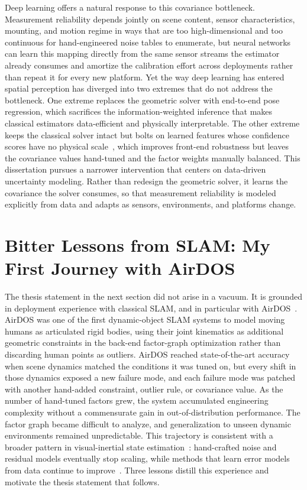Deep learning offers a natural response to this covariance bottleneck.
Measurement reliability depends jointly on scene content, sensor characteristics, mounting, and motion regime in ways that are too high-dimensional and too continuous for hand-engineered noise tables to enumerate, but neural networks can learn this mapping directly from the same sensor streams the estimator already consumes and amortize the calibration effort across deployments rather than repeat it for every new platform.
Yet the way deep learning has entered spatial perception has diverged into two extremes that do not address the bottleneck.
One extreme replaces the geometric solver with end-to-end pose regression, which sacrifices the information-weighted inference that makes classical estimators data-efficient and physically interpretable.
The other extreme keeps the classical solver intact but bolts on learned features whose confidence scores have no physical scale~\cite{teed2021droid, teed2024deep}, which improves front-end robustness but leaves the covariance values hand-tuned and the factor weights manually balanced.
This dissertation pursues a narrower intervention that centers on data-driven uncertainty modeling.
Rather than redesign the geometric solver, it learns the covariance the solver consumes, so that measurement reliability is modeled explicitly from data and adapts as sensors, environments, and platforms change.

\section{Bitter Lessons from SLAM: My First Journey with AirDOS}
\label{sec:bitter_lessons}

The thesis statement in the next section did not arise in a vacuum.
It is grounded in deployment experience with classical SLAM, and in particular with AirDOS~\cite{qiu2022airdos}.
AirDOS was one of the first dynamic-object SLAM systems to model moving humans as articulated rigid bodies, using their joint kinematics as additional geometric constraints in the back-end factor-graph optimization rather than discarding human points as outliers.
AirDOS reached state-of-the-art accuracy when scene dynamics matched the conditions it was tuned on, but every shift in those dynamics exposed a new failure mode, and each failure mode was patched with another hand-added constraint, outlier rule, or covariance value.
As the number of hand-tuned factors grew, the system accumulated engineering complexity without a commensurate gain in out-of-distribution performance.
The factor graph became difficult to analyze, and generalization to unseen dynamic environments remained unpredictable.
This trajectory is consistent with a broader pattern in visual-inertial state estimation~\cite{cadena2016past}: hand-crafted noise and residual models eventually stop scaling, while methods that learn error models from data continue to improve~\cite{sutton2019bitterlesson}.
Three lessons distill this experience and motivate the thesis statement that follows.


